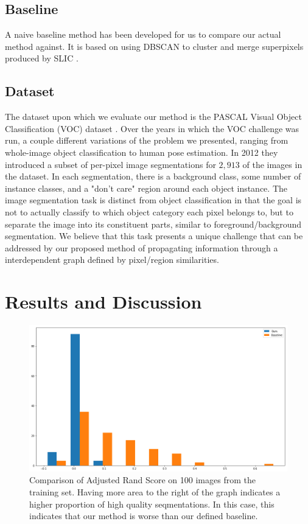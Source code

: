 \documentclass[twocolumn]{article}
\newcommand{\seclab}[1]{\label{sec:#1}}
\newcommand{\figlab}[1]{\label{fig:#1}}
\begin{document}
\subsection{Baseline}

A naive baseline method has been developed for us to compare our actual method
against. It is based on using DBSCAN \cite{ester1996density} to cluster and
merge superpixels produced by SLIC \cite{achanta2010slic}.

\subsection{Dataset}\seclab{data}

The dataset upon which we evaluate our method is the PASCAL Visual Object
Classification (VOC) dataset \cite{Everingham10}. Over the years in which the
VOC challenge was run, a couple different variations of the problem we
presented, ranging from whole-image object classification to human pose
estimation. In 2012 they introduced a subset of per-pixel image segmentations
for $2,913$ of the images in the dataset. In each segmentation, there is a
background class, some number of instance classes, and a "don't care" region
around each object instance. The image segmentation task is distinct from
object classification in that the goal is not to actually classify to which
object category each pixel belongs to, but to separate the image into its
constituent parts, similar to foreground/background segmentation. We believe
that this task presents a unique challenge that can be addressed by our proposed
method of propagating information through a interdependent graph defined by
pixel/region similarities.

\section{Results and Discussion}\seclab{results}

\begin{figure}[t]
  \centering
  \includegraphics[width=\linewidth]{figs/bars.png}
  \caption{Comparison of Adjusted Rand Score on 100 images from the training
  set. Having more area to the right of the graph indicates a higher proportion
  of high quality seqmentations. In this case, this indicates that our method is
  worse than our defined baseline.
  }
  \figlab{bars}
\end{figure}
\end{document}
